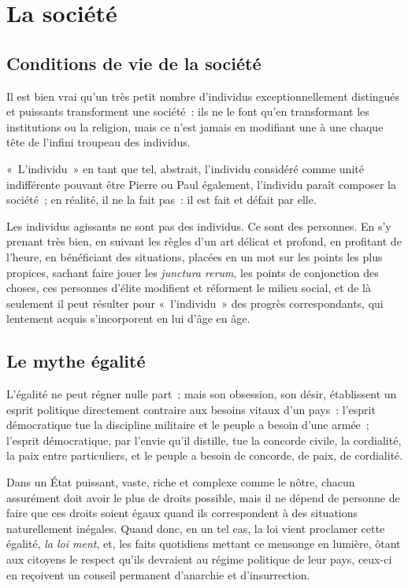 \documentclass[french,twoside]{book} %
\newcommand{\astermono}{\medskip\centerline{\color{rubric}\large\selectfont{\syms ✻}}\medskip\par}%
\begin{document}
\section[{La société}]{La société}
\subsection[{Conditions de vie de la société}]{Conditions de vie de la société}
\noindent Il est bien vrai qu’un très petit nombre d’individus exceptionnellement distingués et puissants transforment une société : ils ne le font qu’en transformant les institutions ou la religion, mais ce n’est jamais en modifiant une à une chaque tête de l’infini troupeau des individus.\par
« L’individu » en tant que tel, abstrait, l’individu considéré comme unité indifférente pouvant être Pierre ou Paul également, l’individu paraît composer la société ; en réalité, il ne la fait pas : il est fait et défait par elle.\par
Les individus agissants ne sont pas des individus. Ce sont des personnes. En s’y prenant très bien, en suivant les règles d’un art délicat et profond, en profitant de l’heure, en bénéficiant des situations, placées en un mot sur les points les plus propices, sachant faire jouer les \emph{junctura rerum}, les points de conjonction des choses, ces personnes d’élite modifient et réforment le milieu social, et de là seulement il peut résulter pour « l’individu » des progrès correspondants, qui lentement acquis s’incorporent en lui d’âge en âge.\par

\astermono

\subsection[{Le mythe égalité}]{Le mythe égalité}
\noindent L’égalité ne peut régner nulle part ; mais son obsession, son désir, établissent un esprit politique directement contraire aux besoins vitaux d’un pays : l’esprit démocratique tue la discipline militaire et le peuple a besoin d’une armée ; l’esprit démocratique, par l’envie qu’il distille, tue la concorde civile, la cordialité, la paix entre particuliers, et le peuple a besoin de concorde, de paix, de cordialité.\par

\astermono

\noindent Dans un État puissant, vaste, riche et complexe comme le nôtre, chacun assurément doit avoir le plus de droits possible, mais il ne dépend de personne de faire que ces droits soient égaux quand ils correspondent à des situations naturellement inégales. Quand donc, en un tel cas, la loi vient proclamer cette égalité, \emph{la loi ment}, et, les faits quotidiens mettant ce mensonge en lumière, ôtant aux citoyens le respect qu’ils devraient au régime politique de leur pays, ceux-ci en reçoivent un conseil permanent d’anarchie et d’insurrection.\par
\end{document}

